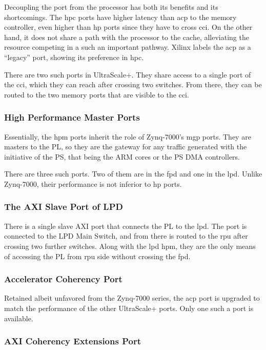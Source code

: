 Decoupling the port from the processor has both its benefits and its shortcomings. 
The \gls{hpc} ports have higher latency than \gls{acp} to the memory controller,
even higher than \gls{hp} ports since they have to cross \gls{cci}.
On the other hand, it does not share a path with the processor to the cache,
alleviating the resource competing in a such an important pathway.
Xilinx labels the \gls{acp} as a ``legacy'' port, 
showing its preference in \gls{hpc}.

There are two such ports in UltraScale+. They share access to a single
port of the \gls{cci}, which they can reach after crossing two switches.
From there, they can be routed to the two memory ports that are visible
to the \gls{cci}.

\subsubsection{High Performance Master Ports}

Essentially, the \gls{hpm} ports inherit the role of Zynq-7000's \gls{mgp} ports.
They are masters to the PL, so they are the gateway for any traffic generated with
the initiative of the PS, that being the ARM cores or the PS DMA controllers.

There are three such ports. Two of them are in the \gls{fpd} and one in the \gls{lpd}.
Unlike Zynq-7000, their performance is not inferior to \gls{hp} ports.

\subsubsection{The AXI Slave Port of LPD}

There is a single slave AXI port that connects the PL to the \acrlong{lpd}.
The port is connected to the LPD Main Switch, and from there is routed to the \gls{rpu}
after crossing two further switches. 
Along with the \gls{lpd} \gls{hpm}, 
they are the only means of accessing the PL from
\gls{rpu} side without crossing the \acrlong{fpd}.


\subsubsection{Accelerator Coherency Port}

Retained albeit unfavored from the Zynq-7000 series, the \gls{acp} port
is upgraded to match the performance of the other UltraScale+ ports.
Only one such a port is available.

\subsubsection{AXI Coherency Extensions Port}

